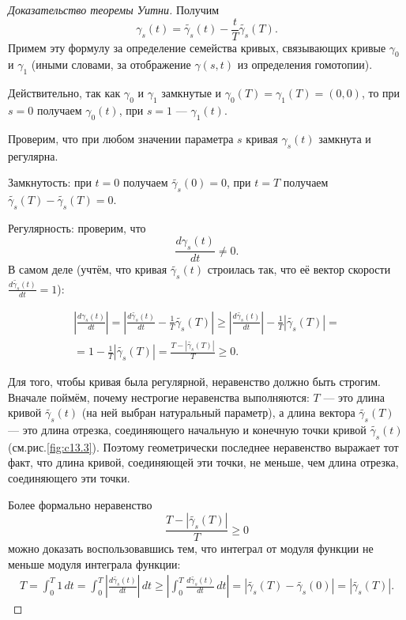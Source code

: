\begin{proof}[Доказательство теоремы Уитни]
    Получим 
    \[\gamma_s(t) = \tilde{\gamma_s}(t) - \frac{t}{T} \tilde{\gamma_s}(T).\]
    Примем эту формулу за определение семейства кривых, связывающих кривые $\gamma_0$ и $\gamma_1$ (иными словами, за отображение $\gamma(s,t)$ из определения гомотопии).

    Действительно, так как $\gamma_0$ и $\gamma_1$ замкнутые и $\gamma_0(T) = \gamma_1(T) = (0,0)$, то при $s=0$ получаем $\gamma_0(t)$, при $s=1$ — $\gamma_1(t)$.

    Проверим, что при любом значении параметра $s$ кривая $\gamma_s(t)$ замкнута и регулярна.
    
    Замкнутость: при $t=0$ получаем $\tilde{\gamma_s}(0) = 0$, при $t=T$ получаем $\tilde{\gamma_s}(T) - \tilde{\gamma_s}(T) = 0$.
    
    Регулярность: проверим, что
    \[\frac{d\gamma_s(t)}{dt} \neq 0.\]
    В самом деле (учтём, что кривая $\tilde{\gamma_s}(t)$ строилась так, что её вектор скорости $\frac{d\tilde{\gamma_s}(t)}{dt} = 1$):

    \begin{multline*}
        \left|\frac{d\gamma_s(t)}{dt}\right| = \left|\frac{d\tilde{\gamma_s}(t)}{dt} - \frac{1}{T}\tilde{\gamma_s}(T)\right| \geqslant \left|\frac{d\tilde{\gamma_s}(t)}{dt}\right| - \frac{1}{T} \left|\tilde{\gamma_s}(T)\right| =\\ 
        = 1 - \frac{1}{T} \left|\tilde{\gamma_s}(T)\right| = \frac{T - \left|\tilde{\gamma_s}(T)\right|}{T} \geqslant 0.
    \end{multline*} 

    Для того, чтобы кривая была регулярной, неравенство должно быть строгим. Вначале поймём, почему нестрогие неравенства выполняются: $T$ — это длина кривой $\tilde{\gamma_s}(t)$ (на ней выбран натуральный параметр), а длина вектора $\tilde{\gamma_s}(T)$ — это длина отрезка, соединяющего начальную и конечную точки кривой $\tilde{\gamma_s}(t)$ (см.рис.\ref{fig:c13.3}).
    Поэтому геометрически последнее неравенство выражает тот факт, что длина кривой, соединяющей эти точки, не меньше, чем длина отрезка, соединяющего эти точки.

    Более формально неравенство 
    \[\frac{T - \left|\tilde{\gamma_s}(T)\right|}{T} \geqslant 0\]
    можно доказать воспользовавшись тем, что интеграл от модуля функции не меньше модуля интеграла функции:
    \begin{multline*}
        T = \int_{0}^{T}1 \, dt = \int_{0}^{T} \left|\frac{d\tilde{\gamma_s}(t)}{dt}\right| \, dt \geqslant \left|\int_{0}^{T}\frac{d\tilde{\gamma_s}(t)}{dt} \, dt\right| = \left|\tilde{\gamma_s}(T) - \tilde{\gamma_s}(0)\right| = \left|\tilde{\gamma_s}(T)\right|.
    \end{multline*} 


\end{proof}

